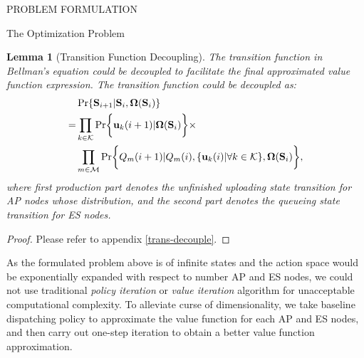 \documentclass[10pt, conference, letterpaper]{IEEEtran}
\newtheorem{lemma}{Lemma}
\renewcommand{\vec}{\mathbf}
\DeclarePairedDelimiter{\set}{\{}{\}}
\DeclarePairedDelimiter{\Brace}{\bigg\{}{\bigg\}}
\newcommand{\apSet}{\mathcal{K}}
\newcommand{\esSet}{\mathcal{M}}
\newcommand{\Stat}{\mathbf{S}}
\newcommand{\Policy}{\mathbf{\Omega}}
\begin{document}
\begin{section}{PROBLEM FORMULATION}
\begin{subsection}{The Optimization Problem}
            \begin{lemma}[Transition Function Decoupling]
                The transition function in Bellman's equation could be decoupled to facilitate the final approximated value function expression. The transition function could be decoupled as:
                \begin{align}
                    & \Pr\{\Stat_{i+1}|\Stat_{i}, \Policy(\Stat_{i})\} 
                    \nonumber\\
                    =& \prod_{k\in\apSet} \Pr\Brace{\vec{u}_k(i+1)|\Policy(\Stat_{i})} \times
                        \nonumber\\
                        & \prod_{m\in\esSet}
                            \Pr \Brace{Q_m(i+1)|Q_m(i), \set{\vec{u}_k(i)|\forall k\in\apSet}, \Policy(\Stat_{i})},
                \end{align}
                where first production part denotes the unfinished uploading state transition for AP nodes whose distribution, and the second part denotes the queueing state transition for ES nodes.
            \end{lemma}
            \begin{proof}
                Please refer to appendix \ref{trans-decouple}.
            \end{proof}

            As the formulated problem above is of infinite states and the action space would be exponentially expanded with respect to number AP and ES nodes, we could not use traditional \emph{policy iteration} or \emph{value iteration} algorithm \cite{sutton1998introduction} for unacceptable computational complexity. To alleviate curse of dimensionality, we take baseline dispatching policy to approximate the value function for each AP and ES nodes, and then carry out one-step iteration to obtain a better value function approximation.
        \end{subsection}
    \end{section}
\end{document}

